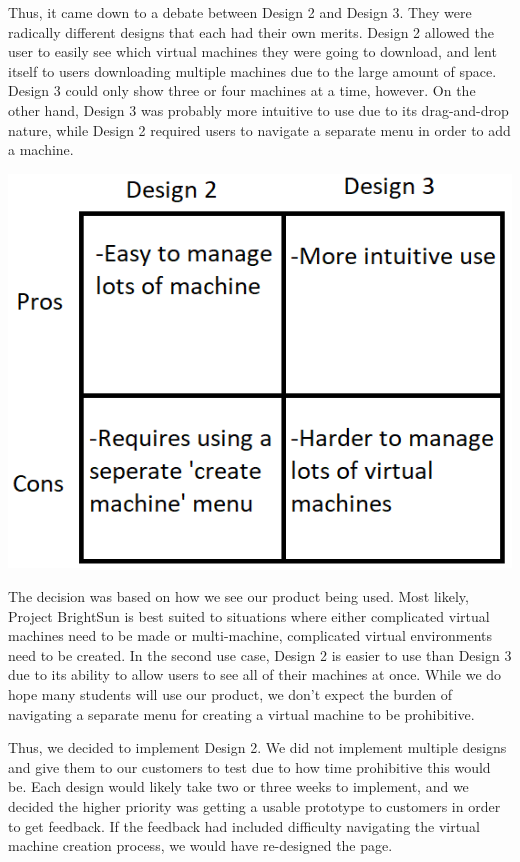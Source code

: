 \documentclass[openright]{report}
\begin{document}
\par Thus, it came down to a debate between Design 2 and Design 3. They were radically different designs that each had their own merits. Design 2 allowed the user to easily see which virtual machines they were going to download, and lent itself to users downloading multiple machines due to the large amount of space. Design 3 could only show three or four machines at a time, however. On the other hand, Design 3 was probably more intuitive to use due to its drag-and-drop nature, while Design 2 required users to navigate a separate menu in order to add a machine.

\begin{center}
    \includegraphics[scale=0.64]{images/proscons.png}
\end{center}

\par The decision was based on how we see our product being used. Most likely, Project BrightSun is best suited to situations where either complicated virtual machines need to be made or multi-machine, complicated virtual environments need to be created. In the second use case, Design 2 is easier to use than Design 3 due to its ability to allow users to see all of their machines at once. While we do hope many students will use our product, we don't expect the burden of navigating a separate menu for creating a virtual machine to be prohibitive.

\par Thus, we decided to implement Design 2. We did not implement multiple designs and give them to our customers to test due to how time prohibitive this would be. Each design would likely take two or three weeks to implement, and we decided the higher priority was getting a usable prototype to customers in order to get feedback. If the feedback had included difficulty navigating the virtual machine creation process, we would have re-designed the page.
\end{document}
